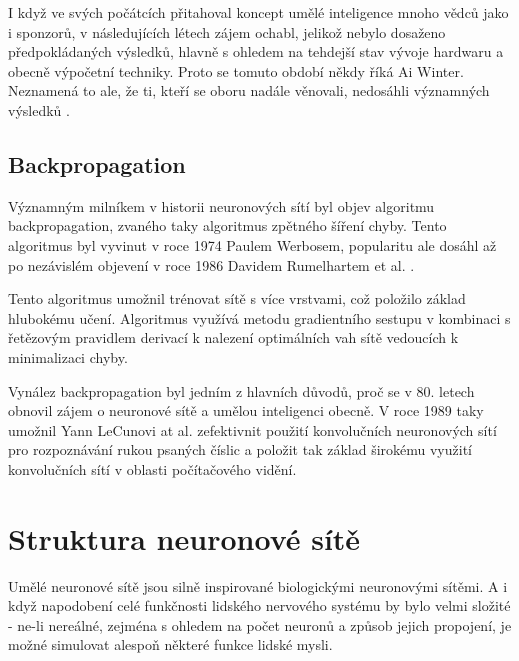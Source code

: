 I když ve svých počátcích přitahoval koncept umělé inteligence mnoho vědců jako
i sponzorů, v následujících létech zájem ochabl, jelikož nebylo dosaženo
předpokládaných výsledků, hlavně s ohledem na tehdejší stav vývoje hardwaru a
obecně výpočetní techniky. Proto se tomuto období někdy říká Ai Winter.
Neznamená to ale, že ti, kteří se oboru nadále věnovali, nedosáhli významných
výsledků \cite{nn_history}.

\subsection{Backpropagation}
Významným milníkem v historii neuronových sítí byl objev algoritmu
backpropagation, zvaného taky algoritmus zpětného šíření chyby. Tento
algoritmus byl vyvinut v roce 1974 Paulem Werbosem, popularitu ale dosáhl až po
nezávislém objevení v roce 1986 Davidem Rumelhartem et al.
\cite{backpropagation}.

Tento algoritmus umožnil trénovat sítě s více vrstvami, což položilo základ
hlubokému učení. Algoritmus využívá metodu gradientního sestupu v kombinaci s
řetězovým pravidlem derivací k nalezení optimálních vah sítě vedoucích k
minimalizaci chyby.

Vynález backpropagation byl jedním z hlavních důvodů, proč se v 80. letech
obnovil zájem o neuronové sítě a umělou inteligenci obecně. V roce 1989 taky
umožnil Yann LeCunovi at al. zefektivnit použití konvolučních neuronových sítí
pro rozpoznávání rukou psaných číslic \cite{lecun1989} a položit tak základ
širokému využití konvolučních sítí v oblasti počítačového vidění.

\section{Struktura neuronové sítě}

Umělé neuronové sítě jsou silně inspirované biologickými neuronovými sítěmi. A
i když napodobení celé funkčnosti lidského nervového systému by bylo velmi
složité - ne-li nereálné, zejména s ohledem na počet neuronů a způsob jejich
propojení, je možné simulovat alespoň některé funkce lidské mysli.


